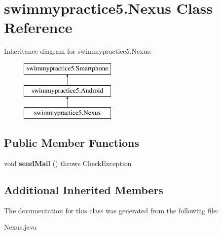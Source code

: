 \hypertarget{classswimmypractice5_1_1_nexus}{}\section{swimmypractice5.\+Nexus Class Reference}
\label{classswimmypractice5_1_1_nexus}
Inheritance diagram for swimmypractice5.\+Nexus\+:\begin{figure}[H]
\begin{center}
\leavevmode
\includegraphics[height=3.000000cm]{classswimmypractice5_1_1_nexus}
\end{center}
\end{figure}
\subsection*{Public Member Functions}
\begin{DoxyCompactItemize}
\item 
\mbox{\label{classswimmypractice5_1_1_nexus_aa66d609fa43e982eb92d528656225765}} 
void {\bfseries send\+Mail} ()  throws Check\+Exception 
\end{DoxyCompactItemize}
\subsection*{Additional Inherited Members}


The documentation for this class was generated from the following file\+:\begin{DoxyCompactItemize}
\item 
Nexus.\+java\end{DoxyCompactItemize}
